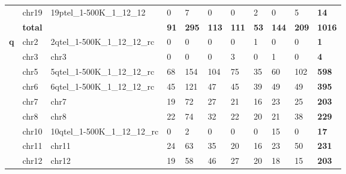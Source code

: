 \begin{samepage}
\begin{table}[h!]
\begin{tabular}{lllllllllll}
\textbf{}      & chr19               & 19ptel\_1-500K\_1\_12\_12       & 0              & 7              & 0              & 0              & 2              & 0              & 5              & \textbf{14}    \\
\textbf{}      & \textbf{total}      & \textbf{}                       & \textbf{91}    & \textbf{295}   & \textbf{113}   & \textbf{111}   & \textbf{53}    & \textbf{144}   & \textbf{209}   & \textbf{1016}  \\
\textbf{q}     & chr2                & 2qtel\_1-500K\_1\_12\_12\_rc    & 0              & 0              & 0              & 0              & 1              & 0              & 0              & \textbf{1}     \\
\textbf{}      & chr3                & chr3                            & 0              & 0              & 0              & 3              & 0              & 1              & 0              & \textbf{4}     \\
\textbf{}      & chr5                & 5qtel\_1-500K\_1\_12\_12\_rc    & 68             & 154            & 104            & 75             & 35             & 60             & 102            & \textbf{598}   \\
\textbf{}      & chr6                & 6qtel\_1-500K\_1\_12\_12\_rc    & 45             & 121            & 47             & 45             & 39             & 49             & 49             & \textbf{395}   \\
\textbf{}      & chr7                & chr7                            & 19             & 72             & 27             & 21             & 16             & 23             & 25             & \textbf{203}   \\
\textbf{}      & chr8                & chr8                            & 22             & 74             & 32             & 22             & 20             & 21             & 38             & \textbf{229}   \\
\textbf{}      & chr10               & 10qtel\_1-500K\_1\_12\_12\_rc   & 0              & 2              & 0              & 0              & 0              & 15             & 0              & \textbf{17}    \\
\textbf{}      & chr11               & chr11                           & 24             & 63             & 35             & 20             & 16             & 23             & 50             & \textbf{231}   \\
\textbf{}      & chr12               & chr12                           & 19             & 58             & 46             & 27             & 20             & 18             & 15             & \textbf{203}   \\

\end{tabular}
\end{table}
\end{samepage}
